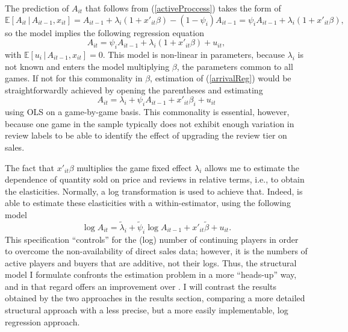 \documentclass[
  12pt,
  pagebackref]{article}
\begin{document}
The prediction of \(A_{it}\) that follows from (\ref{activeProccess})
takes the form of \begin{equation}
\mathbb{E}\left[A_{it}\,|\,A_{it-1}, x_{it} \right] = A_{it-1} + \lambda_i(1+x'_{it}\beta) - (1-\psi_i)A_{it-1} = \psi_i A_{it-1} + \lambda_i(1+x'_{it}\beta),
\end{equation} so the model implies the following regression equation
\begin{equation}\label{arrivalReg}
 A_{it} = \psi_i A_{it-1} + \lambda_i(1+x'_{it}\beta) + u_{it},
\end{equation} with
\(\mathbb{E}\left[u_i\,|\,A_{it-1}, x_{it} \right] = 0\). This model is
non-linear in parameters, because \(\lambda_i\) is not known and enters
the model multiplying \(\beta\), the parameters common to all games. If
not for this commonality in \(\beta\), estimation of (\ref{arrivalReg})
would be straightforwardly achieved by opening the parentheses and
estimating \begin{equation}\label{arrivalRegInd}
A_{it} = \lambda_i + \psi_i A_{it-1} + x'_{it}\beta_i + u_{it}
\end{equation} using OLS on a game-by-game basis. This commonality is
essential, however, because one game in the sample typically does not
exhibit enough variation in review labels to be able to identify the
effect of upgrading the review tier on sales.

The fact that \(x'_{it}\beta\) multiplies the game fixed effect
\(\lambda_i\) allows me to estimate the dependence of quantity sold on
price and reviews in relative terms, i.e., to obtain the elasticities.
Normally, a log transformation is used to achieve that. Indeed,
\citet{SorokinStevens20} is able to estimate these elasticities with a
within-estimator, using the following model
\begin{equation}\label{logReg}
\log A_{it} = \tilde\lambda_i + \tilde\psi_i \log A_{it-1} + x'_{it}\tilde \beta + u_{it}.
\end{equation} This specification ``controls'' for the (log) number of
continuing players in order to overcome the non-availability of direct
sales data; however, it is the numbers of active players and buyers that
are additive, not their logs. Thus, the structural model I formulate
confronts the estimation problem in a more ``heads-up'' way, and in that
regard offers an improvement over \citet{SorokinStevens20}. I will
contrast the results obtained by the two approaches in the results
section, comparing a more detailed structural approach with a less
precise, but a more easily implementable, log regression approach.
\end{document}
